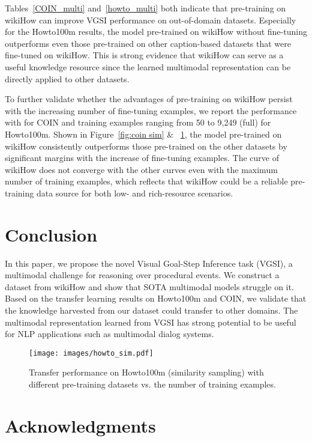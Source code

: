 \documentclass[11pt]{article}
\begin{document}
Tables~\ref{COIN_multi} and~\ref{howto_multi} both indicate that pre-training on wikiHow can improve VGSI performance on out-of-domain datasets. Especially for the Howto100m results, the model pre-trained on wikiHow without fine-tuning outperforms even those pre-trained on other caption-based datasets that were fine-tuned on wikiHow. This is strong evidence that wikiHow can serve as a useful knowledge resource since the learned multimodal representation can be directly applied to other datasets. 

To further validate whether the advantages of pre-training on wikiHow persist with the increasing number of fine-tuning examples, we report the performance with  for COIN and training examples ranging from 50 to 9,249 (full) for Howto100m. Shown in Figure~\ref{fig:coin sim} \& ~\ref{fig:howto random}, the model pre-trained on wikiHow consistently outperforms those pre-trained on the other datasets by significant margins with the increase of fine-tuning examples. The curve of wikiHow does not converge with the other curves even with the maximum number of training examples, which reflects that wikiHow could be a reliable pre-training data source for both low- and rich-resource scenarios. 

\section{Conclusion}
In this paper, we propose the novel Visual Goal-Step Inference task (VGSI), a multimodal challenge for reasoning over procedural events. We construct a dataset from wikiHow and show that SOTA multimodal models struggle on it. Based on the transfer learning results on Howto100m and COIN, we validate that the knowledge harvested from our dataset could transfer to other domains. The multimodal representation learned from VGSI has strong potential to be useful for NLP applications such as multimodal dialog systems.

\begin{figure}[!t]
    \texttt{[image: images/howto\_sim.pdf]}
    \caption{Transfer performance on Howto100m (similarity sampling) with different pre-training datasets vs. the number of training examples.}
    \label{fig:howto random}
    \vspace{-0.1in}
\end{figure}

\vspace{-0.1in}
\section*{Acknowledgments}
\vspace{-0.05in}
\end{document}
